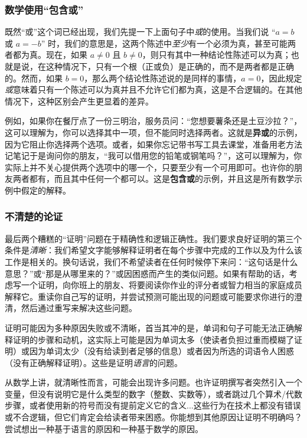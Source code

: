 \subsubsection*{数学使用``包含或''}

既然``或''这个词已经出现，我们先提一下上面句子中\emph{或}的使用。当我们说 ``$a = b$ 或 $a = -b$'' 时，我们的意思是，这两个陈述中\emph{至少}有一个必须为真，甚至可能两者都为真。现在，如果 $a \ne 0$ 且 $b \ne 0$，则只有其中一种结论性陈述可以为真；也就是说，在这种情况下，只有一个根（正或负）是正确的，而不是两者都是正确的。然而，如果 $b = 0$，那么两个结论性陈述说的是同样的事情，$a = 0$，因此规定\emph{或}意味着只有一个陈述可以为真并且不允许它们都为真，这是不合逻辑的。在其他情况下，这种区别会产生更显着的差异。

例如，如果你在餐厅点了一份三明治，服务员问：``您想要薯条还是土豆沙拉？''，这可以理解为，你可以选择其中一项，但不能同时选择两者。这就是\textbf{异或}的示例，因为它阻止你选择两个选项。或者，如果你忘记带书写工具去课堂，准备用老方法记笔记于是询问你的朋友，``我可以借用您的铅笔或钢笔吗？''，这可以理解为，你实际上并不关心提供两个选项中的哪一个，只要至少有一个可用即可。也许你的朋友两者都有，而且其中任何一个都可以。这是\textbf{包含或}的示例，并且这是所有数学示例中假定的解释。

\subsubsection*{不清楚的论证}

最后两个糟糕的``证明''问题在于精确性和逻辑正确性。我们要求良好证明的第三个条件是\emph{清晰}：我们希望文字能够解释证明者在每个步骤中完成的工作以及为什么该工作是相关的。换句话说，我们不希望读者在任何时候停下来问：``这句话是什么意思？''或``那是从哪里来的？''或因困惑而产生的类似问题。如果有帮助的话，考虑写一个证明，向你班上的朋友、将要阅读你作业的评分者或智力相当的家庭成员解释它。重读你自己写的证明，并尝试预测可能出现的问题或可能要求你进行的澄清，然后通过重写来解决这些问题。

证明可能因为多种原因失败或不清晰，首当其冲的是，单词和句子可能无法正确解释证明的步骤和动机，这实际上可能是因为单词太多（使读者负担过重而模糊了证明）或因为单词太少（没有给读到者足够的信息）或者因为所选的词语令人困惑（没有正确解释证明）。这些是证明\emph{语言}的问题。

从数学上讲，就清晰性而言，可能会出现许多问题。也许证明撰写者突然引入一个变量，但没有说明它是什么类型的数字（整数、实数等），或者跳过几个算术/代数步骤，或者使用新的符号而没有提前定义它的含义...这些行为在技术上都没有错误或不合逻辑，但它们肯定会给读者带来困惑。你能想到其他原因让证明不明确吗？尝试想出一种基于语言的原因和一种基于数学的原因。

